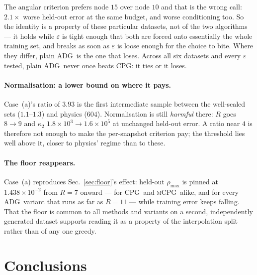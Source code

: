 \documentclass[11pt]{article}
\newcommand{\CPG}{\textsc{CPG}}
\newcommand{\ADG}{\textsc{ADG}}
\newcommand{\mCPG}{\textsc{mCPG}}
\begin{document}
The angular criterion prefers node $15$ over node $10$ and that is the wrong call:
$2.1\times$ worse held-out error at the same budget, and worse conditioning too. So
the identity is a property of these particular datasets, not of the two
algorithms --- it holds while $\varepsilon$ is tight enough that both are forced
onto essentially the whole training set, and breaks as soon as $\varepsilon$ is
loose enough for the choice to bite. Where they differ, plain \ADG\ is the one that
loses. Across all six datasets and every $\varepsilon$ tested, plain \ADG\ never
once beats \CPG: it ties or it loses.

\paragraph{Normalisation: a lower bound on where it pays.}
Case~(a)'s ratio of $3.93$ is the first intermediate sample between the well-scaled
sets ($1.1$--$1.3$) and physics ($604$). Normalisation is still \emph{harmful}
there: $R$ goes $8\to9$ and $\kappa_2$ $1.8\times10^{3}\to1.6\times10^{5}$ at
unchanged held-out error. A ratio near $4$ is therefore not enough to make the
per-snapshot criterion pay; the threshold lies well above it, closer to physics'
regime than to these.

\paragraph{The floor reappears.}
Case~(a) reproduces Sec.~\ref{sec:floor}'s effect: held-out $\rho_{\max}$ is pinned
at $1.438\times10^{-2}$ from $R=7$ onward --- for \CPG\ and \mCPG\ alike, and for
every \ADG\ variant that runs as far as $R=11$ --- while training error keeps
falling. That the floor is common to all methods and variants on a second,
independently generated dataset supports reading it as a property of the
interpolation split rather than of any one greedy.

\section{Conclusions}
\end{document}
